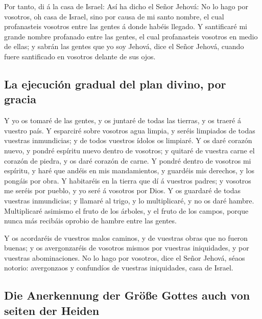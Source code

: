  Por tanto, di á la casa de Israel: Así ha dicho el Señor
Jehová: No lo hago por vosotros, oh casa de Israel, sino por causa de mi
santo nombre, el cual profanasteis vosotros entre las gentes á donde
habéis llegado.  Y santificaré mi grande nombre profanado
entre las gentes, el cual profanasteis vosotros en medio de ellas; y
sabrán las gentes que yo soy Jehová, dice el Señor Jehová, cuando fuere
santificado en vosotros delante de sus ojos.

\hypertarget{la-ejecuciuxf3n-gradual-del-plan-divino-por-gracia}{%
\subsection{La ejecución gradual del plan divino, por
gracia}\label{la-ejecuciuxf3n-gradual-del-plan-divino-por-gracia}}

 Y yo os tomaré de las gentes, y os juntaré de todas las
tierras, y os traeré á vuestro país.  Y esparciré sobre
vosotros agua limpia, y seréis limpiados de todas vuestras inmundicias;
y de todos vuestros ídolos os limpiaré.  Y os daré
corazón nuevo, y pondré espíritu nuevo dentro de vosotros; y quitaré de
vuestra carne el corazón de piedra, y os daré corazón de carne.
 Y pondré dentro de vosotros mi espíritu, y haré que
andéis en mis mandamientos, y guardéis mis derechos, y los pongáis por
obra.  Y habitaréis en la tierra que dí á vuestros
padres; y vosotros me seréis por pueblo, y yo seré á vosotros por Dios.
 Y os guardaré de todas vuestras inmundicias; y llamaré
al trigo, y lo multiplicaré, y no os daré hambre. 
Multiplicaré asimismo el fruto de los árboles, y el fruto de los campos,
porque nunca más recibáis oprobio de hambre entre las gentes.

 Y os acordaréis de vuestros malos caminos, y de vuestras
obras que no fueron buenas; y os avergonzaréis de vosotros mismos por
vuestras iniquidades, y por vuestras abominaciones.  No
lo hago por vosotros, dice el Señor Jehová, séaos notorio: avergonzaos y
confundíos de vuestras iniquidades, casa de Israel.

\hypertarget{die-anerkennung-der-gruxf6uxdfe-gottes-auch-von-seiten-der-heiden}{%
\subsection{Die Anerkennung der Größe Gottes auch von seiten der
Heiden}\label{die-anerkennung-der-gruxf6uxdfe-gottes-auch-von-seiten-der-heiden}}

